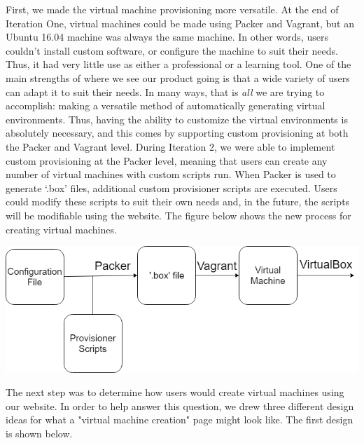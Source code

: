 \documentclass[openright]{report}
\begin{document}
\par First, we made the virtual machine provisioning more versatile. At the end of Iteration One, virtual machines could be made using Packer and Vagrant, but an Ubuntu 16.04 machine was always the same machine. In other words, users couldn't install custom software, or configure the machine to suit their needs. Thus, it had very little use as either a professional or a learning tool. One of the main strengths of where we see our product going is that a wide variety of users can adapt it to suit their needs. In many ways, that is \textit{all} we are trying to accomplish: making a versatile method of automatically generating virtual environments. Thus, having the ability to customize the virtual environments is absolutely necessary, and this comes by supporting custom provisioning at both the Packer and Vagrant level. During Iteration 2, we were able to implement custom provisioning at the Packer level, meaning that users can create any number of virtual machines with custom scripts run. When Packer is used to generate `.box' files, additional custom provisioner scripts are executed. Users could modify these scripts to suit their own needs and, in the future, the scripts will be modifiable using the website. The figure below shows the new process for creating virtual machines.

\begin{center}
    \includegraphics[scale=0.64]{images/Proto2.png}
    \label{scriptFlow}
\end{center}

\par The next step was to determine how users would create virtual machines using our website. In order to help answer this question, we drew three different design ideas for what a "virtual machine creation" page might look like. The first design is shown below.
\end{document}
